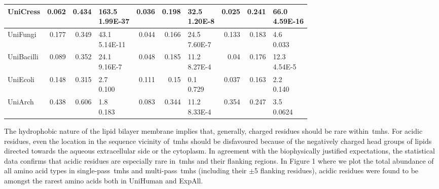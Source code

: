 \begin{table}[htbp]
{\begin{tabular}{p{5em}rrp{5em}rrp{5em}rrp{5em}}
    \midrule
    UniCress & 0.062 & 0.434 & \specialcell{163.5 \\ 1.99E-37} & 0.036 & 0.198 & \specialcell{32.5 \\ 1.20E-8} & 0.025 & 0.241 & \specialcell{66.0 \\ 4.59E-16} \\
    \midrule
    UniFungi & 0.177 & 0.349 & \specialcell{43.1 \\ 5.14E-11} & 0.044 & 0.166 & \specialcell{24.5 \\ 7.60E-7} & 0.133 & 0.183 & \specialcell{4.6 \\ 0.033 }\\
    \midrule
    UniBacilli & 0.089 & 0.352 & \specialcell{24.1 \\ 9.16E-7} & 0.048 & 0.185 & \specialcell{11.2 \\ 8.27E-4} & 0.04  & 0.176 & \specialcell{12.3 \\ 4.54E-5} \\
    \midrule
    UniEcoli & 0.148 & 0.315 & \specialcell{2.7 \\ 0.100} & 0.111 & 0.15  & \specialcell{0.1 \\ 0.729 }& 0.037 & 0.163 & \specialcell{2.2 \\ 0.140 }\\
    \midrule
    UniArch & 0.438 & 0.606 & \specialcell{1.8 \\ 0.183} & 0.083 & 0.344 & \specialcell{11.2 \\ 8.33E-4} & 0.354 & 0.247 & \specialcell{3.5 \\ 0.0624 }\\
    \bottomrule
   \end{tabular}}%
   \label{table:acidicresiduesarerare}

\end{table}%

The hydrophobic nature of the lipid bilayer membrane implies that, generally, charged residues should be rare within~\gls{tmh}s.
For acidic residues, even the location in the sequence vicinity of~\gls{tmh}s should be disfavoured because of the negatively charged head groups of lipids directed towards the aqueous extracellular side or the cytoplasm.
In agreement with the biophysically justified expectations, the statistical data confirms that acidic residues are especially rare in~\gls{tmh}s and their flanking regions.
In Figure 1 where we plot the total abundance of all amino acid types in single-pass~\gls{tmh}s and multi-pass~\gls{tmh}s (including their $\pm$5 flanking residues), acidic residues were found to be amongst the rarest amino acids both in UniHuman and ExpAll.

